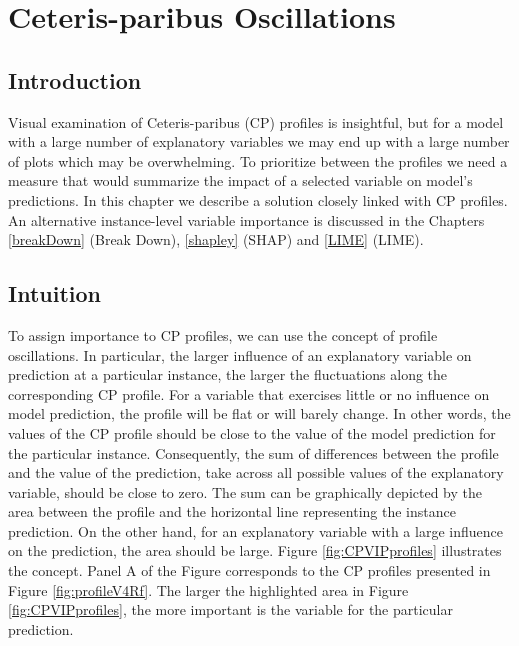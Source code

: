 \documentclass[]{krantz}
\begin{document}
\hypertarget{ceterisParibusOscillations}{%
\chapter{Ceteris-paribus Oscillations}\label{ceterisParibusOscillations}}

\hypertarget{CPOscIntro}{%
\section{Introduction}\label{CPOscIntro}}

Visual examination of Ceteris-paribus (CP) profiles is insightful, but for a model with a large number of explanatory variables we may end up with a large number of plots which may be overwhelming. To prioritize between the profiles we need a measure that would summarize the impact of a selected variable on model's predictions. In this chapter we describe a solution closely linked with CP profiles. An alternative instance-level variable importance is discussed in the Chapters \ref{breakDown} (Break Down), \ref{shapley} (SHAP) and \ref{LIME} (LIME).

\hypertarget{CPOscIntuition}{%
\section{Intuition}\label{CPOscIntuition}}

To assign importance to CP profiles, we can use the concept of profile oscillations. In particular, the larger influence of an explanatory variable on prediction at a particular instance, the larger the fluctuations along the corresponding CP profile. For a variable that exercises little or no influence on model prediction, the profile will be flat or will barely change. In other words, the values of the CP profile should be close to the value of the model prediction for the particular instance. Consequently, the sum of differences between the profile and the value of the prediction, take across all possible values of the explanatory variable, should be close to zero. The sum can be graphically depicted by the area between the profile and the horizontal line representing the instance prediction. On the other hand, for an explanatory variable with a large influence on the prediction, the area should be large. Figure \ref{fig:CPVIPprofiles} illustrates the concept. Panel A of the Figure corresponds to the CP profiles presented in Figure \ref{fig:profileV4Rf}. The larger the highlighted area in Figure \ref{fig:CPVIPprofiles}, the more important is the variable for the particular prediction.
\end{document}
